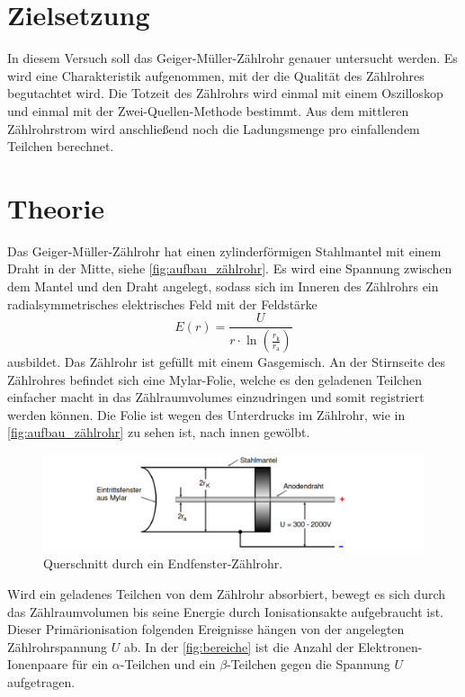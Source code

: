 \section{Zielsetzung}
\label{sec:Zielsetzung}
In diesem Versuch soll das Geiger-Müller-Zählrohr genauer untersucht werden. Es wird eine Charakteristik aufgenommen, mit der die Qualität des Zählrohres begutachtet wird.
Die Totzeit des Zählrohrs wird einmal mit einem Oszilloskop und einmal mit der Zwei-Quellen-Methode bestimmt. 
Aus dem mittleren Zählrohrstrom wird anschließend noch die Ladungsmenge pro einfallendem Teilchen berechnet.
\section{Theorie}
\label{sec:Theorie}
Das Geiger-Müller-Zählrohr hat einen zylinderförmigen Stahlmantel mit einem Draht in der Mitte, siehe \autoref{fig:aufbau_zählrohr}.
Es wird eine Spannung zwischen dem Mantel und den Draht angelegt, sodass sich im Inneren des Zählrohrs ein radialsymmetrisches elektrisches Feld mit der Feldstärke
\begin{equation*}
    E(r) = \frac{U}{r \cdot \ln(\frac{r_{\text{k}}}{r_{\text{a}}})}
\end{equation*}
ausbildet.
Das Zählrohr ist gefüllt mit einem Gasgemisch.
An der Stirnseite des Zählrohres befindet sich eine Mylar-Folie, welche es den geladenen Teilchen einfacher macht in das Zählraumvolumes einzudringen und somit registriert werden können.
Die Folie ist wegen des Unterdrucks im Zählrohr, wie in \autoref{fig:aufbau_zählrohr} zu sehen ist, nach innen gewölbt.
\begin{figure}
    \centering
    \includegraphics[width=\textwidth]{content/aufbau_zahlrohr.pdf}
    \caption{Querschnitt durch ein Endfenster-Zählrohr.\cite{anleitung}}
    \label{fig:aufbau_zählrohr}
\end{figure}
Wird ein geladenes Teilchen von dem Zählrohr absorbiert, bewegt es sich durch das Zählraumvolumen bis seine Energie durch Ionisationsakte aufgebraucht ist.
Dieser Primärionisation folgenden Ereignisse hängen von der angelegten Zählrohrspannung $U$ ab.
In der \autoref{fig:bereiche} ist die Anzahl der Elektronen-Ionenpaare für ein $\alpha$-Teilchen und ein $\beta$-Teilchen gegen die Spannung $U$ aufgetragen.
